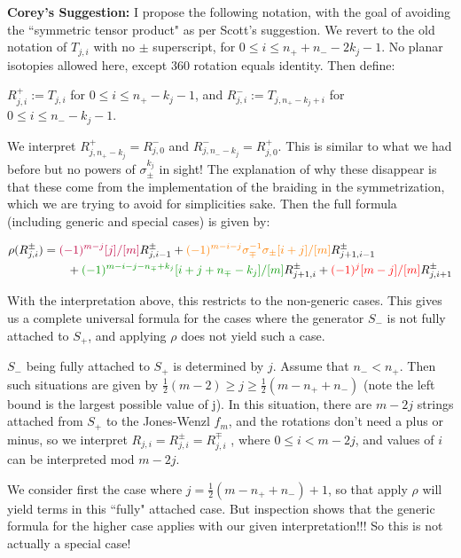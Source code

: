 \documentclass{article}
\begin{document}

\bigskip

\textbf{Corey's Suggestion:}  I propose the following notation, with the goal of avoiding the ``symmetric tensor product" as per Scott's suggestion.  We revert to the old notation of $T_{j,i}$ with no $\pm$ superscript, for $0\le i\le n_{+}+n_{-}-2k_{j}-1$.  No planar isotopies allowed here, except 360 rotation equals identity.  Then define:

\medskip

$R^{+}_{j,i}:=T_{j,i}$ for $0\le i\le n_{+}-k_{j}-1$, and $R^{-}_{j,i}:=T_{j,n_{+}-k_{j}+i}$ for $0\le i\le n_{-}-k_{j}-1$.

We interpret $R^{+}_{j,n_{+}-k_{j}}=R^{-}_{j,0}$ and $R^{-}_{j,n_{-}-k_{j}}=R^{+}_{j,0}$.  This is similar to what we had before but no powers of $\sigma_{\pm}^{k_j}$ in sight!  The explanation of why these disappear is that these come from the implementation of the braiding in the symmetrization, which we are trying to avoid for simplicities sake.  Then the full formula (including generic and special cases) is given by:
 
 \begin{align*}
\rho(R^\pm_{j,i}) 
&= 
\textcolor{purple}{(-1)^{m-j}[j]/[m]} R^\pm_{j,i-1}
+\textcolor{orange}{(-1)^{m-i-j} \sigma^{-1}_\mp\sigma_\pm [i+j]/[m] } R^\pm_{j+1,i-1}
\\ &\qquad
+\textcolor{DarkGreen}{(-1)^{m-i-j-n_{\mp}+k_j}[i+j+n_{\mp}-k_j]/[m]} R^\pm_{j+1,i}
+\textcolor{red}{(-1)^j [m-j]/[m]} R^\pm_{j,i+1}
\end{align*}
 
With the interpretation above, this restricts to the non-generic cases.  This gives us a complete universal formula for the cases where the generator $S_{-}$ is not fully attached to $S_{+}$, and applying $\rho$ does not yield such a case.

$S_{-}$ being fully attached to $S_{+}$ is determined by $j$.  Assume that $n_{-}<n_{+} $. Then such situations are given by $\frac{1}{2}(m-2)\ge j\ge \frac{1}{2}(m-n_{+}+n_{-})$ (note the left bound is the largest possible value of j).  In this situation, there are $m-2j$ strings attached from $S_{+}$ to the Jones-Wenzl $f_{m}$, and the rotations don't need a plus or minus, so we interpret $R_{j,i}=R^{\pm}_{j,i}=R^{\mp}_{j,i}$ , where $0\le i <m-{2j}$, and values of $i$ can be interpreted mod $m-2j$. 

We consider first the case where $j=\frac{1}{2}(m-n_{+}+n_{-})+1$, so that apply $\rho$ will yield terms in this ``fully" attached case.  But inspection shows that the generic formula for the higher case applies with our given interpretation!!! So this is not actually a special case!
\end{document}

